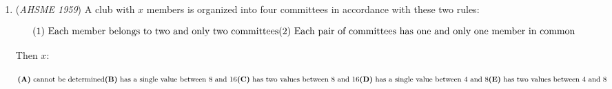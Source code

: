 \begin{enumerate}
	\item (\textit{AHSME 1959}) A club with $x$ members is organized into four committees in accordance with these two rules:


 
 \[\text{(1)}\ \textup{Each member belongs to two and only two committees}\qquad \\ \text{(2)}\ \textup{Each pair of committees has one and only one member in common}\]


 Then $x$:


 $\textbf{(A)} \ \textup{cannot be determined} \qquad \\ \textbf{(B)} \ \textup{has a single value between 8 and 16} \qquad \\ \textbf{(C)} \ \textup{has two values between 8 and 16} \qquad \\ \textbf{(D)} \ \textup{has a single value between 4 and 8} \qquad \\ \textbf{(E)} \ \textup{has two values between 4 and 8}$


\end{enumerate}
